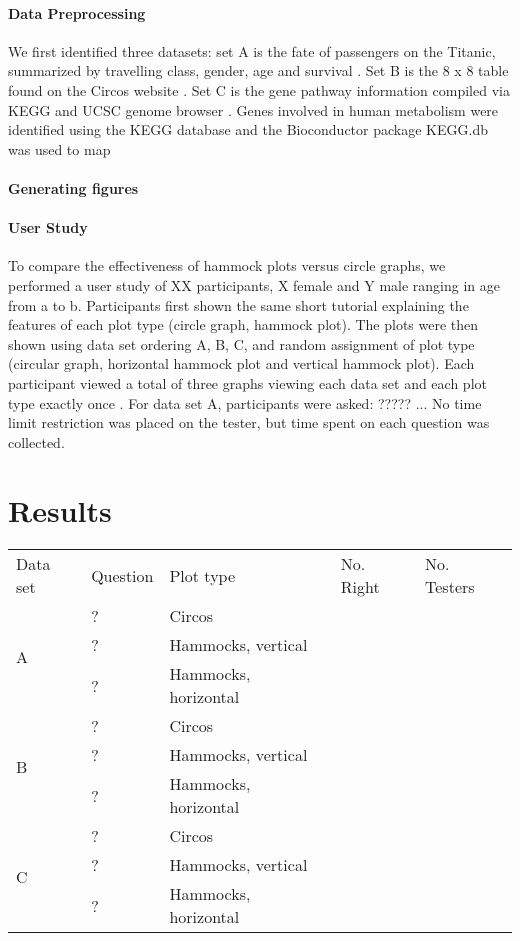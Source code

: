 \documentclass{vgtc}                          %
\begin{document}
\paragraph{Data Preprocessing}
We first identified three datasets: set A is the fate of passengers on the Titanic, summarized by travelling class, gender, age and survival \cite{titanic}. Set B is the 8 x 8 table found on the Circos website \cite{circosdata}. Set C is the gene pathway information compiled via KEGG \cite{KEGG12} \cite{KEGG00} and UCSC genome browser \cite{ucsc02} \cite{ucsc10}. Genes involved in human metabolism were identified using the KEGG database and the Bioconductor package KEGG.db \cite{keggdb} was used to map

\paragraph{Generating figures}
\paragraph{User Study} To compare the effectiveness of hammock plots versus circle graphs, we performed a user study of XX participants, X female and Y male ranging in age from a to b.  Participants first shown the same short tutorial explaining the features of each plot type (circle graph, hammock plot). The plots were then shown using data set ordering A, B, C, and random assignment of plot type (circular graph, horizontal hammock plot and vertical hammock plot). Each participant viewed a total of three graphs viewing each data set and each plot type exactly once . For data set A, participants were asked: ????? ... No time limit restriction was placed on the tester, but time spent on each question was collected.

\section{Results}
\begin{table}[h]
\begin{tabular}{p{.5cm}p{2cm}lp{.6cm}p{.75cm}}
Data set & Question & Plot type & No. Right & No. Testers\\
\multirow{3}{*}{A} & ? & Circos & & \\
 & ? & Hammocks, vertical & & \\
 & ? & Hammocks, horizontal & & \\ 
\hline
\multirow{3}{*}{B} & ? & Circos & & \\
 & ? & Hammocks, vertical & & \\
 & ? & Hammocks, horizontal & & \\ 
\hline
\multirow{3}{*}{C} & ? & Circos & & \\
 & ? & Hammocks, vertical & & \\
 & ? & Hammocks, horizontal & & \\ 
\end{tabular}

\end{table}
\end{document}
